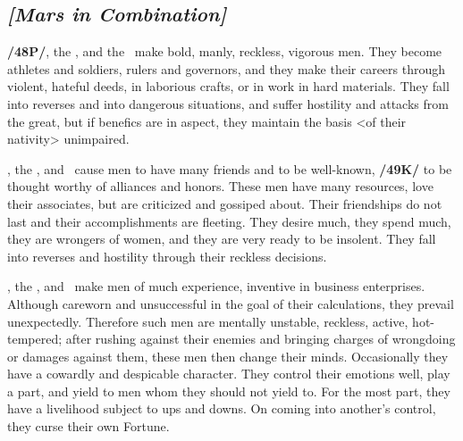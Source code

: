 \secbr
{}
\subsection{\textit{[Mars in Combination]}}
\textbf{/48P/}\Mars, the \Sun, and the \Moon\, make bold, manly, reckless, vigorous men. They become athletes and soldiers, rulers and governors, and they make their careers through violent, hateful deeds, in laborious crafts, or in work in hard materials. They fall into reverses and into dangerous situations, and suffer hostility and attacks from the great, but if benefics are in aspect, they maintain the basis <of their nativity> unimpaired.

\Mars, the \Sun, and \Venus\, cause men to have many friends and to be well-known, \textbf{/49K/} to be thought worthy of alliances and honors. These men have many resources, love their associates, but are criticized and gossiped about. Their friendships do not last and their accomplishments are fleeting. They desire much, they spend much, they are wrongers of women, and they are very ready to be insolent. They fall into reverses and hostility through their reckless decisions.

\Mars, the \Sun, and \Mercury\, make men of much experience, inventive in business enterprises. Although careworn and unsuccessful in the goal of their calculations, they prevail unexpectedly. Therefore such men are mentally unstable, reckless, active, hot-tempered; after rushing against their enemies and bringing charges of wrongdoing or damages against them, these men then change their minds.
Occasionally they have a cowardly and despicable character. They control their emotions well, play a part, and yield to men whom they should not yield to. For the most part, they have a livelihood subject to ups and downs. On coming into another’s control, they curse their own Fortune.

